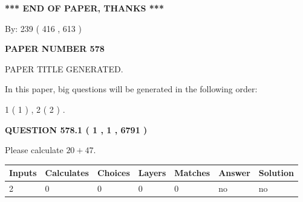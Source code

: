 \documentclass[12pt]{article}
\begin{document}
   
\vspace{1.0in} 
{\textbf{\large{ *** END OF PAPER, THANKS *** }}} 
   
   
\hspace{1.0in} By: 
 239 ( 416 ,  613 )
   
   
   
   
\newpage 
\setcounter{page}{ 
   578001 } 
   
   
   
   
 {\textbf{ \Large{ PAPER NUMBER  578  }}}
   
   
\vspace{0.2in}
   
   
   
   
   
   
   
   
 \vspace{0.2in}
 
 
 
 
   
   
 PAPER TITLE GENERATED.
   
   
   
\vspace{0.2in}
   
In this paper, big questions will be generated in the following order: 
   
   
   1 ( 1 )
 ,
   2 ( 2 )
 .
  
\vspace{0.2in}
  
{\textbf{\Large{QUESTION
578.1 
 ( 1 , 1 , 6791 )
}}}
  
  
 
Please calculate $ %
20 +  %
47 $.
 
 
   
   
   
   
\noindent\begin{tabular}{|l|l|l|l|l|l|l|}
 \hline
Inputs & Calculates & Choices & Layers & Matches & Answer & Solution \\ \hline
 2  & 
 0  & 
 0
  & 
 0  & 
 0  & 
  no & 
  no 
  \\ \hline
 \end{tabular}
   
   
   
   
\noindent{}
   
\end{document}
